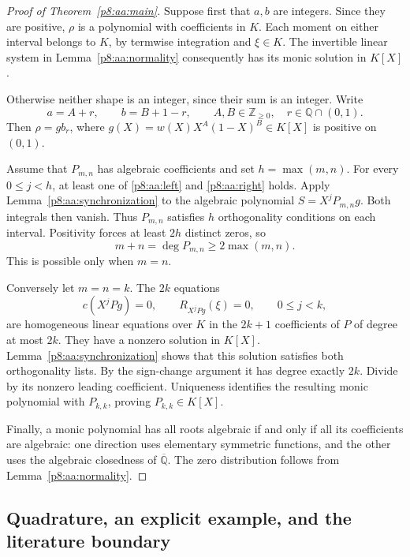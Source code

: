 \documentclass[11pt,a4paper]{article}
\theoremstyle{definition}
\theoremstyle{remark}
\numberwithin{equation}{section}
\begin{document}
\begin{proof}[Proof of Theorem~\ref{p8:aa:main}]
Suppose first that $a,b$ are integers. Since they are positive,
$\rho$ is a polynomial with coefficients in $K$. Each moment on
either interval belongs to $K$, by termwise integration and
$\xi\in K$. The invertible linear system in
Lemma~\ref{p8:aa:normality} consequently has its monic solution in $K[X]$.

Otherwise neither shape is an integer, since their sum is an integer.
Write
\[
 a=A+r,\qquad b=B+1-r,\qquad A,B\in\mathbb Z_{\ge0},
 \quad r\in\mathbb Q\cap(0,1).
\]
Then $\rho=g b_r$, where
$g(X)=w(X)X^A(1-X)^B\in K[X]$ is positive on $(0,1)$.

Assume that $P_{m,n}$ has algebraic coefficients and set
$h=\max(m,n)$. For every $0\le j<h$, at least one of
\eqref{p8:aa:left} and \eqref{p8:aa:right} holds. Apply
Lemma~\ref{p8:aa:synchronization} to the algebraic polynomial
$S=X^jP_{m,n}g$. Both integrals then vanish. Thus $P_{m,n}$
satisfies $h$ orthogonality conditions on each interval. Positivity
forces at least $2h$ distinct zeros, so
\[
 m+n=\deg P_{m,n}\ge 2\max(m,n).
\]
This is possible only when $m=n$.

Conversely let $m=n=k$. The $2k$ equations
\begin{equation}\label{p8:aa:balanced-system}
 c(X^jPg)=0,\qquad R_{X^jPg}(\xi)=0,
 \qquad 0\le j<k,
\end{equation}
are homogeneous linear equations over $K$ in the $2k+1$
coefficients of $P$ of degree at most $2k$. They have a nonzero
solution in $K[X]$. Lemma~\ref{p8:aa:synchronization} shows that
this solution satisfies both orthogonality lists. By the sign-change
argument it has degree exactly $2k$. Divide by its nonzero leading
coefficient. Uniqueness identifies the resulting monic polynomial
with $P_{k,k}$, proving $P_{k,k}\in K[X]$.

Finally, a monic polynomial has all roots algebraic if and only if
all its coefficients are algebraic: one direction uses elementary
symmetric functions, and the other uses the algebraic closedness of
$\overline{\mathbb Q}$. The zero distribution follows from
Lemma~\ref{p8:aa:normality}.
\end{proof}

\subsection{Quadrature, an explicit example, and the literature boundary}
\end{document}
